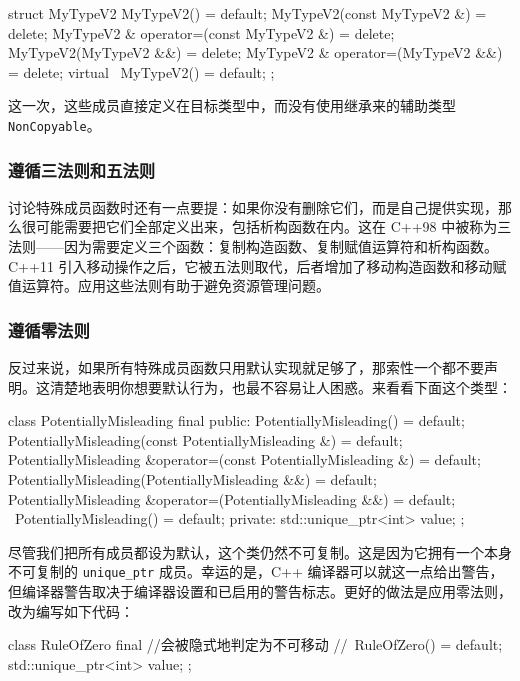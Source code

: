 \begin{codebox}[cpp]
struct MyTypeV2 {
    MyTypeV2() = default;
    MyTypeV2(const MyTypeV2 &) = delete;
    MyTypeV2 & operator=(const MyTypeV2 &) = delete;
    MyTypeV2(MyTypeV2 &&) = delete;
    MyTypeV2 & operator=(MyTypeV2 &&) = delete;
    virtual ~MyTypeV2() = default;
};
\end{codebox}

这一次，这些成员直接定义在目标类型中，而没有使用继承来的辅助类型 \texttt{Non\allowbreak{}Copyable}。

\subsubsection{遵循三法则和五法则}

\label{idx:524}
讨论特殊成员函数时还有一点要提：如果你没有删除它们，而是自己提供实现，那么很可能需要把它们全部定义出来，包括析构函数在内。这在 C++98 中被称为三法则——因为需要定义三个函数：复制构造函数、复制赋值运算符和析构函数。C++11 引入移动操作之后，它被五法则取代，后者增加了移动构造函数和移动赋值运算符。应用这些法则有助于避免资源管理问题。

\subsubsection{遵循零法则}

\label{idx:525}
反过来说，如果所有特殊成员函数只用默认实现就足够了，那索性一个都不要声明。这清楚地表明你想要默认行为，也最不容易让人困惑。来看看下面这个类型：

\begin{codebox}[cpp]
class PotentiallyMisleading final {
public:
    PotentiallyMisleading() = default;
    PotentiallyMisleading(const PotentiallyMisleading &) = default;
    PotentiallyMisleading &operator=(const PotentiallyMisleading &) = default;
    PotentiallyMisleading(PotentiallyMisleading &&) = default;
    PotentiallyMisleading &operator=(PotentiallyMisleading &&) = default;
    ~PotentiallyMisleading() = default;
private:
    std::unique_ptr<int> value;
};
\end{codebox}

尽管我们把所有成员都设为默认，这个类仍然不可复制。这是因为它拥有一个本身不可复制的 \texttt{unique\_\allowbreak{}ptr} 成员。幸运的是，C++ 编译器可以就这一点给出警告，但编译器警告取决于编译器设置和已启用的警告标志。更好的做法是应用零法则，改为编写如下代码：

\begin{codebox}[cpp]
class RuleOfZero final {
    //会被隐式地判定为不可移动
    //~RuleOfZero() = default;
    std::unique_ptr<int> value;
};
\end{codebox}

